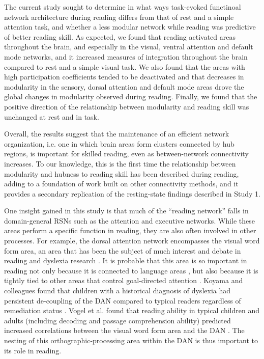 The current study sought to determine in what ways task-evoked functinoal network architecture during reading differs from that of rest and a simple attention task, and whether a less modular network while reading was predictive of better reading skill. As expected, we found that reading activated areas throughout the brain, and especially in the visual, ventral attention and default mode networks, and it increased measures of integration throughout the brain compared to rest and a simple visual task. We also found that the areas with high participation coefficients tended to be deactivated  and that decreases in modularity in the sensory, dorsal attention and default mode areas drove the global changes in modularity observed during reading. Finally, we found that the positive direction of the relationship between modularity and reading skill was unchanged at rest and in task.

Overall, the results suggest that the maintenance of an efficient network organization, i.e. one in which brain areas form clusters connected by hub regions, is important for skilled reading, even as between-network connectivity increases. To our knowledge, this is the first time the relationship between modularity and hubness to reading skill has been described during reading, adding to a foundation of work built on other connectivity methods, and it provides a secondary replication of the resting-state findings described in Study 1.

One insight gained in this study is that much of the ``reading network'' falls in domain-general RSNs such as the attention and executive networks. While these areas perform a specific function in reading, they are also often involved in other processes. For example, the dorsal attention network encompasses the visual word form area, an area that has been the subject of much interest and debate in reading and dyslexia research \citep{McCandliss2003}. It is probable that this area is so important in reading not only because it is connected to language areas \citep{Bouhali2014}, but also because it is tightly tied to other areas that control goal-directed attention \citep{Vogel2014}. Koyama and colleagues found that children with a historical diagnosis of dyslexia had persistent de-coupling of the DAN compared to typical readers regardless of remediation status \citep{Koyama2013}. Vogel et al. found that reading ability in typical children and adults (including decoding and passage comprehension ability) predicted increased correlations between the visual word form area and the DAN \citep{Vogel2012a}. The nesting of this orthographic-processing area within the DAN is thus important to its role in reading.

